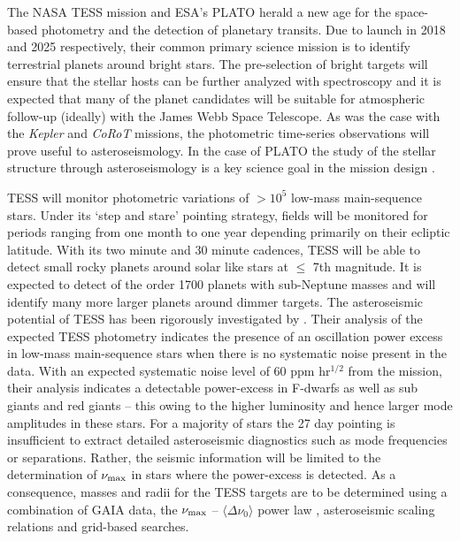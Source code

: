The NASA TESS mission \citep{2015JATIS...1a4003R} and ESA's PLATO \citep{2014ExA....38..249R} herald a new age for the space-based photometry and the detection of planetary transits. Due to launch in 2018 and 2025 respectively, their common primary science mission is to identify terrestrial planets around bright stars. The pre-selection of bright targets will ensure that the stellar hosts can be further analyzed with spectroscopy and it is expected that many of the planet candidates will be suitable for atmospheric follow-up (ideally) with the James Webb Space Telescope. As was the case with the \emph{Kepler} and \emph{CoRoT} missions, the photometric time-series observations will prove useful to asteroseismology. In the case of PLATO the study of the stellar structure through asteroseismology is a key science goal in the mission design \citep{2014ExA....38..249R}.  

TESS will monitor photometric variations of $> 10^5$ low-mass main-sequence stars. Under its `step and stare' pointing strategy, fields will be monitored for periods ranging from one month to one year depending primarily on their ecliptic latitude. With its two minute and 30 minute cadences, TESS will be able to detect small rocky planets around solar like stars at $\le$ 7th magnitude. It is expected to detect of the order 1700 planets with sub-Neptune masses \citep{2016ApJ...830..138C} and will identify many more larger planets around dimmer targets.  The asteroseismic potential of TESS has been rigorously investigated by \citet{2016ApJ...830..138C}. Their analysis of the expected TESS photometry indicates the presence of an oscillation power excess 
in low-mass main-sequence stars when there is no systematic noise present in the data. With an expected systematic noise level of  60 ppm hr$^{1/2}$ from the mission, their analysis indicates a detectable power-excess in F-dwarfs as well as sub giants and red giants -- this owing to the higher luminosity and hence larger mode amplitudes in these stars. For a majority of stars the 27 day pointing is insufficient to extract detailed asteroseismic diagnostics such as mode frequencies or separations. Rather, the seismic information will be limited to the determination of $\nu_{\rm{max}}$ in stars where the power-excess is detected. As a consequence, masses and radii for the TESS targets are to be determined using a combination of  GAIA data, the  $\nu_{\rm{max}}$ -- $\langle\Delta\nu_0\rangle$ power law \citep{2009A&A...506..465H,2009MNRAS.400L..80S} , asteroseismic scaling relations and grid-based searches.  
 

